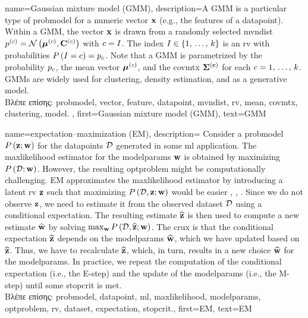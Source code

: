 {name={Gaussian mixture model (GMM)}, 
	description={A GMM 
		is a particular type of \gls{probmodel} for a numeric \gls{vector} ${\bf x}$ (e.g., 
		the \gls{feature}s of a \gls{datapoint}). Within a GMM, the \gls{vector} ${\bf x}$ is drawn from a randomly 
		selected \gls{mvndist} $p^{(c)} = \mathcal{N}\left({\bm \mu}^{(c)},\mathbf{C}^{(c)}\right)$ with 
		$c = I$. The index $I \in \{1, \,\ldots, \,k\}$ is an \gls{rv} with probabilities $P\left(I=c\right) = p_{c}$.
	     	Note that a GMM is parametrized by the \gls{probability} $p_{c}$, the 
		\gls{mean} \gls{vector} ${\bm \mu}^{(c)}$, and the \gls{covmtx} $\bf\Sigma^{(c)}$ for each $c=1, \,\ldots, \,k$. 
		GMMs are widely used for \gls{clustering}, density estimation, and as a generative \gls{model}.\\
		\foreignlanguage{greek}{Βλέπε επίσης:} \gls{probmodel}, \gls{vector}, \gls{feature}, \gls{datapoint}, \gls{mvndist}, \gls{rv}, 
		\gls{mean}, \gls{covmtx}, \gls{clustering}, \gls{model}. },
	first={Gaussian mixture model (GMM)},
	text={GMM} 
}
	 
{name={expectation–maximization (EM)}, 
	description={ 
		Consider a \gls{probmodel} $P\left({\bf z}; {\bf w}\right)$ for the \gls{datapoint}s $\mathcal{D}$ generated in some 
		\gls{ml} application. The \gls{maxlikelihood} estimator for the \glspl{modelparam} ${\bf w}$ is obtained by maximizing 
		$P\left(\mathcal{D}; {\bf w}\right)$. However, the resulting \gls{optproblem} might be computationally 
		challenging. EM approximates the \gls{maxlikelihood} estimator by introducing a latent 
		\gls{rv} ${\bf z}$ such that maximizing $P\left(\mathcal{D},{\bf z}; {\bf w}\right)$ would be 
		easier \cite{hastie01statisticallearning}, \cite{BishopBook}, \cite{GraphModExpFamVarInfWainJor}. Since we 
		do not observe ${\bf z}$, we need to estimate it from the observed \gls{dataset} $\mathcal{D}$ 
		using a conditional \gls{expectation}. The resulting estimate $\widehat{{\bf z}}$ is then used to 
		compute a new estimate $\widehat{{\bf w}}$ by solving $\max_{{\bf w}} P\left(\mathcal{D}, \widehat{{\bf z}}; {\bf w}\right)$. 
		The crux is that the conditional \gls{expectation} $\widehat{{\bf z}}$ depends on the \glspl{modelparam} $\widehat{{\bf w}}$, 
		which we have updated based on $\widehat{{\bf z}}$. Thus, we have to recalculate $\widehat{{\bf z}}$, 
		which, in turn, results in a new choice $\widehat{{\bf w}}$ for the \glspl{modelparam}. In practice, 
		we repeat the computation of the conditional \gls{expectation} (i.e., the E-step) and the update 
		of the \glspl{modelparam} (i.e., the M-step) until some \gls{stopcrit} is met.\\
		\foreignlanguage{greek}{Βλέπε επίσης:} \gls{probmodel}, \gls{datapoint}, \gls{ml}, \gls{maxlikelihood}, \glspl{modelparam}, 
		\gls{optproblem}, \gls{rv}, \gls{dataset}, \gls{expectation}, \gls{stopcrit}.},
	first={EM},
  	text={EM}
}


